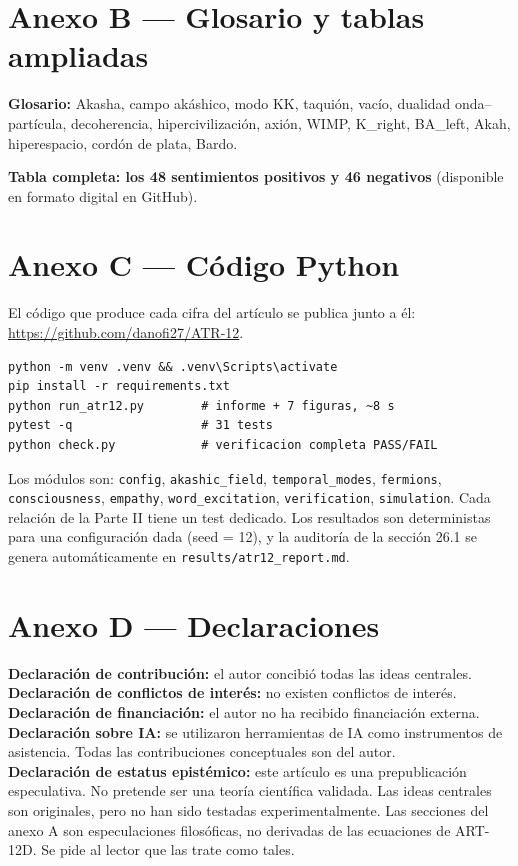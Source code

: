 \documentclass[11pt,a4paper]{article}
\begin{document}
\section{Anexo B --- Glosario y tablas ampliadas}
\textbf{Glosario:} Akasha, campo akáshico, modo KK, taquión, vacío, dualidad onda--partícula, decoherencia, hipercivilización, axión, WIMP, K\_right, BA\_left, Akah, hiperespacio, cordón de plata, Bardo.

\textbf{Tabla completa: los 48 sentimientos positivos y 46 negativos} (disponible en formato digital en GitHub).

\section{Anexo C --- Código Python}
El código que produce cada cifra del artículo se publica junto a él: \url{https://github.com/danofi27/ATR-12}.

\begin{verbatim}
python -m venv .venv && .venv\Scripts\activate
pip install -r requirements.txt
python run_atr12.py        # informe + 7 figuras, ~8 s
pytest -q                  # 31 tests
python check.py            # verificacion completa PASS/FAIL
\end{verbatim}

Los módulos son: \texttt{config}, \texttt{akashic\_field}, \texttt{temporal\_modes}, \texttt{fermions}, \texttt{consciousness}, \texttt{empathy}, \texttt{word\_excitation}, \texttt{verification}, \texttt{simulation}. Cada relación de la Parte II tiene un test dedicado. Los resultados son deterministas para una configuración dada (seed = 12), y la auditoría de la sección 26.1 se genera automáticamente en \texttt{results/atr12\_report.md}.

\section{Anexo D --- Declaraciones}
\textbf{Declaración de contribución:} el autor concibió todas las ideas centrales. \\
\textbf{Declaración de conflictos de interés:} no existen conflictos de interés. \\
\textbf{Declaración de financiación:} el autor no ha recibido financiación externa. \\
\textbf{Declaración sobre IA:} se utilizaron herramientas de IA como instrumentos de asistencia. Todas las contribuciones conceptuales son del autor. \\
\textbf{Declaración de estatus epistémico:} este artículo es una prepublicación especulativa. No pretende ser una teoría científica validada. Las ideas centrales son originales, pero no han sido testadas experimentalmente. Las secciones del anexo A son especulaciones filosóficas, no derivadas de las ecuaciones de ART-12D. Se pide al lector que las trate como tales.
\end{document}
